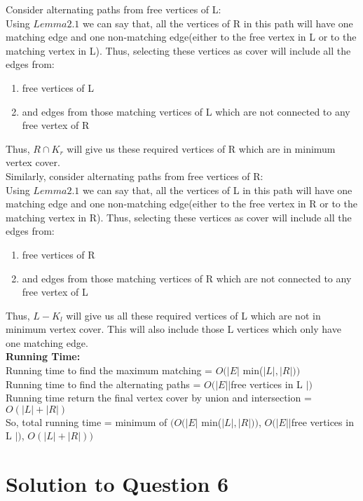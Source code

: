 \documentclass[11pt]{article}
\begin{document}
Consider alternating paths from free vertices of L: \\
Using $Lemma 2.1$ we can say that, all the vertices of R in this path will have one matching edge and one non-matching edge(either to 
the free vertex in L or to the matching vertex in L). Thus, selecting these vertices as cover will include all the edges from: \\
\begin{enumerate}
	\item free vertices of L
	\item and edges from those matching vertices of L which are not connected to any free vertex of R
\end{enumerate}
Thus, $R \cap K_r$ will give us these required vertices of R which are in minimum vertex cover. \\
Similarly, consider alternating paths from free vertices of R: \\
Using $Lemma 2.1$ we can say that, all the vertices of L in this path will have one matching edge and one non-matching edge(either to 
the free vertex in R or to the matching vertex in R). Thus, selecting these vertices as cover will include all the edges from: \\
\begin{enumerate}
	\item free vertices of R
	\item and edges from those matching vertices of R which are not connected to any free vertex of L
\end{enumerate}
Thus, $L - K_l$ will give us all these required vertices of L which are not in minimum vertex cover. This  will also include those L 
vertices which only have one matching edge. \\
\textbf{Running Time:} \\
Running time to find the maximum matching = $O(|E|$ min($|L|, |R|))$ \\
Running time to find the alternating paths = $O(|E| |$free vertices in L $|)$ \\
Running time return the final vertex cover by union and intersection = $O(|L|+|R|)$ \\
So, total running time = minimum of $(O(|E|$ min($|L|, |R|))$, $O(|E| |$free vertices in L $|)$, $O(|L|+|R|))$

\section{Solution to Question 6}
\end{document}
